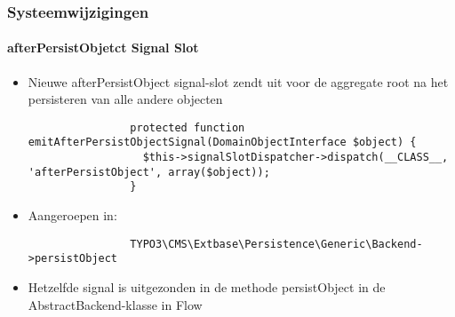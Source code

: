 \begin{frame}[fragile]
	\frametitle{Systeemwijzigingen}
	\framesubtitle{afterPersistObjetct Signal Slot}

	\lstset{
		basicstyle=\tiny\ttfamily
	}

	\begin{itemize}

		\item Nieuwe afterPersistObject signal-slot zendt uit voor de aggregate root na het persisteren van alle andere objecten

			\begin{lstlisting}
				protected function emitAfterPersistObjectSignal(DomainObjectInterface $object) {
				  $this->signalSlotDispatcher->dispatch(__CLASS__, 'afterPersistObject', array($object));
				}
			\end{lstlisting}

		\item Aangeroepen in:

			\begin{lstlisting}
				TYPO3\CMS\Extbase\Persistence\Generic\Backend->persistObject
			\end{lstlisting}

		\item Hetzelfde signal is uitgezonden in de methode persistObject in de AbstractBackend-klasse in Flow

	\end{itemize}

\end{frame}                                                 


